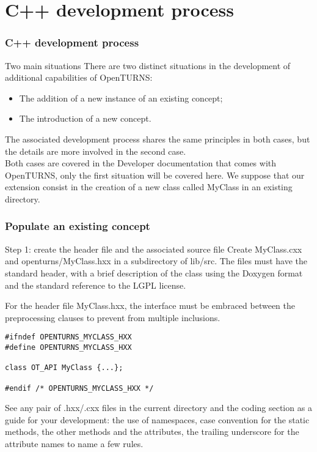 \documentclass[8pt]{beamer}
\begin{document}
\section[C++ development process]{C++ development process}
\begin{frame}
  \frametitle{C++ development process}
  \begin{block}{Two main situations}
    There are two distinct situations in the development of additional capabilities of OpenTURNS:
    \begin{itemize}
      \item The addition of a new instance of an existing concept;
      \item The introduction of a new concept.
    \end{itemize}
    The associated development process shares the same principles in both cases, but the details are more involved in the second case.\\
    Both cases are covered in the \alert{Developer} documentation that comes with OpenTURNS, only the first situation will be covered here. We suppose that our extension consist in the creation of a new class called MyClass in an existing directory.
  \end{block}
\end{frame}
\begin{frame}[fragile]
  \frametitle{Populate an existing concept}
  \begin{block}{Step 1: create the header file and the associated source file}
    Create MyClass.cxx and openturns/MyClass.hxx in a subdirectory of lib/src. The files must have the standard header,
    with a brief description of the class using the Doxygen format and the standard reference to the LGPL license.
  
  For the header file MyClass.hxx, the interface must be embraced between the preprocessing clauses to prevent from multiple inclusions.

\begin{lstlisting}
#ifndef OPENTURNS_MYCLASS_HXX
#define OPENTURNS_MYCLASS_HXX

class OT_API MyClass {...};

#endif /* OPENTURNS_MYCLASS_HXX */
\end{lstlisting}

  See any pair of .hxx/.cxx files in the current directory and the coding section as a guide for your development: the use of namespaces, case convention for the static methods, the other methods and the attributes, the trailing underscore for the attribute names to name a few rules.
  \end{block}
\end{frame}
\end{document}
